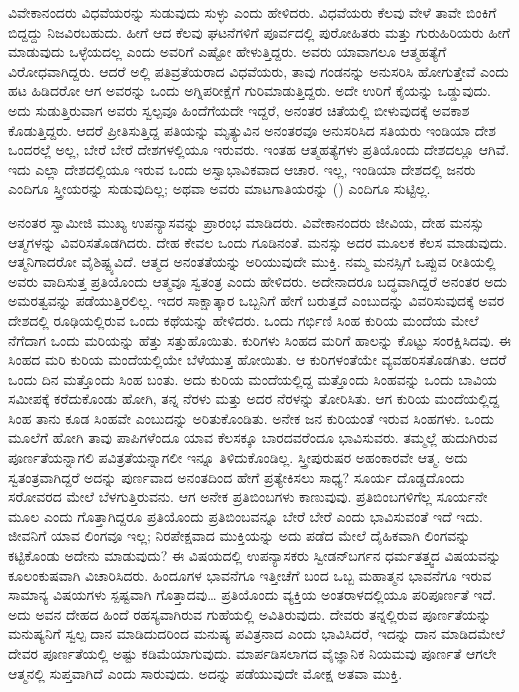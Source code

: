  ವಿವೇಕಾನಂದರು ವಿಧವೆಯರನ್ನು ಸುಡುವುದು ಸುಳ್ಳು ಎಂದು ಹೇಳಿದರು. ವಿಧವೆಯರು ಕೆಲವು ವೇಳೆ ತಾವೇ ಬಿಂಕಿಗೆ ಬಿದ್ದದ್ದು ನಿಜವಿರಬಹುದು. ಹೀಗೆ ಆದ ಕೆಲವು ಘಟನೆಗಳಿಗೆ ಪೂರ್ವದಲ್ಲಿ ಪುರೋಹಿತರು ಮತ್ತು ಗುರುಹಿರಿಯರು ಹೀಗೆ ಮಾಡುವುದು ಒಳ್ಳೆಯದಲ್ಲ ಎಂದು ಅವರಿಗೆ ಎಷ್ಟೋ ಹೇಳುತ್ತಿದ್ದರು. ಅವರು ಯಾವಾಗಲೂ ಆತ್ಮಹತ್ಯೆಗೆ ವಿರೋಧವಾಗಿದ್ದರು. ಆದರೆ ಅಲ್ಲಿ ಪತಿವ್ರತೆಯರಾದ ವಿಧವೆಯರು, ತಾವು ಗಂಡನನ್ನು ಅನುಸರಿಸಿ ಹೋಗುತ್ತೇವೆ ಎಂದು ಹಟ ಹಿಡಿದರೋ ಆಗ ಅವರನ್ನು ಒಂದು ಅಗ್ನಿಪರೀಕ್ಷೆಗೆ ಗುರಿಮಾಡುತ್ತಿದ್ದರು. ಅದೇ ಉರಿಗೆ ಕೈಯನ್ನು ಒಡ್ಡುವುದು. ಅದು ಸುಡುತ್ತಿರುವಾಗ ಅವರು ಸ್ವಲ್ಪವೂ ಹಿಂದೆಗೆಯದೇ ಇದ್ದರೆ, ಅನಂತರ ಚಿತೆಯಲ್ಲಿ ಬೀಳುವುದಕ್ಕೆ ಅವಕಾಶ ಕೊಡುತ್ತಿದ್ದರು. ಆದರೆ ಪ್ರೀತಿಸುತ್ತಿದ್ದ ಪತಿಯನ್ನು ಮೃತ್ಯುವಿನ ಅನಂತರವೂ ಅನುಸರಿಸಿದ ಸತಿಯರು ಇಂಡಿಯಾ ದೇಶ ಒಂದರಲ್ಲೆ ಅಲ್ಲ, ಬೇರೆ ಬೇರೆ ದೇಶಗಳಲ್ಲಿಯೂ ಇರುವರು. ಇಂತಹ ಆತ್ಮಹತ್ಯೆಗಳು ಪ್ರತಿಯೊಂದು ದೇಶದಲ್ಲೂ ಆಗಿವೆ. ಇದು ಎಲ್ಲಾ ದೇಶದಲ್ಲಿಯೂ ಇರುವ ಒಂದು ಅಸ್ವಾಭಾವಿಕವಾದ ಆಚಾರ. ಇಲ್ಲ, ಇಂಡಿಯಾ ದೇಶದಲ್ಲಿ ಜನರು ಎಂದಿಗೂ ಸ್ತ್ರೀಯರನ್ನು ಸುಡುವುದಿಲ್ಲ; ಅಥವಾ ಅವರು ಮಾಟಗಾತಿಯರನ್ನು () ಎಂದಿಗೂ ಸುಟ್ಟಿಲ್ಲ. 

 ಅನಂತರ ಸ್ವಾಮೀಜಿ ಮುಖ್ಯ ಉಪನ್ಯಾಸವನ್ನು ಪ್ರಾರಂಭ ಮಾಡಿದರು. ವಿವೇಕಾನಂದರು ಜೀವಿಯ, ದೇಹ ಮನಸ್ಸು ಆತ್ಮಗಳನ್ನು ವಿವರಿಸತೊಡಗಿದರು. ದೇಹ ಕೇವಲ ಒಂದು ಗೂಡಿನಂತೆ. ಮನಸ್ಸು ಅದರ ಮೂಲಕ ಕೆಲಸ ಮಾಡುವುದು. ಆತ್ಮನಿಗಾದರೋ ವೈಶಿಷ್ಟ್ಯವಿದೆ. ಆತ್ಮದ ಅನಂತತೆಯನ್ನು ಅರಿಯುವುದೇ ಮುಕ್ತಿ. ನಮ್ಮ ಮನಸ್ಸಿಗೆ ಒಪ್ಪುವ ರೀತಿಯಲ್ಲಿ ಅವರು ವಾದಿಸುತ್ತ ಪ್ರತಿಯೊಂದು ಆತ್ಮವೂ ಸ್ವತಂತ್ರ ಎಂದು ಹೇಳಿದರು. ಅದೇನಾದರೂ ಬದ್ಧವಾಗಿದ್ದರೆ ಅನಂತರ ಅದು ಅಮರತ್ವವನ್ನು ಪಡೆಯುತ್ತಿರಲಿಲ್ಲ. ಇದರ ಸಾಕ್ಷಾತ್ಕಾರ ಒಬ್ಬನಿಗೆ ಹೇಗೆ ಬರುತ್ತದೆ ಎಂಬುದನ್ನು ವಿವರಿಸುವುದಕ್ಕೆ ಅವರ ದೇಶದಲ್ಲಿ ರೂಢಿಯಲ್ಲಿರುವ ಒಂದು ಕಥೆಯನ್ನು ಹೇಳಿದರು. ಒಂದು ಗರ್ಭಿಣಿ ಸಿಂಹ ಕುರಿಯ ಮಂದೆಯ ಮೇಲೆ ನೆಗೆದಾಗ ಒಂದು ಮರಿಯನ್ನು ಹೆತ್ತು ಸತ್ತುಹೊಯಿತು. ಕುರಿಗಳು ಸಿಂಹದ ಮರಿಗೆ ಹಾಲನ್ನು ಕೊಟ್ಟು ಸಂರಕ್ಷಿಸಿದವು. ಈ ಸಿಂಹದ ಮರಿ ಕುರಿಯ ಮಂದೆಯಲ್ಲಿಯೇ ಬೆಳೆಯುತ್ತ ಹೋಯಿತು. ಆ ಕುರಿಗಳಂತೆಯೇ ವ್ಯವಹರಿಸತೊಡಗಿತು. ಆದರೆ ಒಂದು ದಿನ ಮತ್ತೊಂದು ಸಿಂಹ ಬಂತು. ಅದು ಕುರಿಯ ಮಂದೆಯಲ್ಲಿದ್ದ ಮತ್ತೊಂದು ಸಿಂಹವನ್ನು ಒಂದು ಬಾವಿಯ ಸಮೀಪಕ್ಕೆ ಕರೆದುಕೊಂಡು ಹೋಗಿ, ತನ್ನ ನೆರಳು ಮತ್ತು ಅದರ ನೆರಳನ್ನು ತೋರಿಸಿತು. ಆಗ ಕುರಿಯ ಮಂದೆಯಲ್ಲಿದ್ದ ಸಿಂಹ ತಾನು ಕೂಡ ಸಿಂಹವೇ ಎಂಬುದನ್ನು ಅರಿತುಕೊಂಡಿತು. ಅನೇಕ ಜನ ಕುರಿಯಂತೆ ಇರುವ ಸಿಂಹಗಳು. ಒಂದು ಮೂಲೆಗೆ ಹೋಗಿ ತಾವು ಪಾಪಿಗಳೆಂದೂ ಯಾವ ಕೆಲಸಕ್ಕೂ ಬಾರದವರೆಂದೂ ಭಾವಿಸುವರು. ತಮ್ಮಲ್ಲೆ ಹುದುಗಿರುವ ಪೂರ್ಣತೆಯನ್ನಾಗಲಿ ಪವಿತ್ರತೆಯನ್ನಾಗಲೀ ಇನ್ನೂ ತಿಳಿದುಕೊಂಡಿಲ್ಲ. ಸ್ತ್ರೀಪುರುಷರ ಅಹಂಕಾರವೇ ಆತ್ಮ. ಅದು ಸ್ವತಂತ್ರವಾಗಿದ್ದರೆ ಅದನ್ನು ಪುರ್ಣವಾದ ಅನಂತದಿಂದ ಹೇಗೆ ಪ್ರತ್ಯೇಕಿಸಲು ಸಾಧ್ಯ? ಸೂರ್ಯ ದೊಡ್ಡದೊಂದು ಸರೋವರದ ಮೇಲೆ ಬೆಳಗುತ್ತಿರುವನು. ಆಗ ಅನೇಕ ಪ್ರತಿಬಿಂಬಗಳು ಕಾಣುವುವು. ಪ್ರತಿಬಿಂಬಗಳಿಗೆಲ್ಲ ಸೂರ್ಯನೇ ಮೂಲ ಎಂದು ಗೊತ್ತಾಗಿದ್ದರೂ ಪ್ರತಿಯೊಂದು ಪ್ರತಿಬಿಂಬವನ್ನೂ ಬೇರೆ ಬೇರೆ ಎಂದು ಭಾವಿಸುವಂತೆ ಇದೆ ಇದು. ಜೀವನಿಗೆ ಯಾವ ಲಿಂಗವೂ ಇಲ್ಲ; ನಿರಪೇಕ್ಷವಾದ ಮುಕ್ತಿಯನ್ನು ಅದು ಪಡೆದ ಮೇಲೆ ದೈಹಿಕವಾಗಿ ಲಿಂಗವನ್ನು ಕಟ್ಟಿಕೊಂಡು ಅದೇನು ಮಾಡುವುದು? ಈ ವಿಷಯದಲ್ಲಿ ಉಪನ್ಯಾಸಕರು ಸ್ವೀಡನ್‍ಬರ್ಗನ ಧರ್ಮತತ್ತ್ವದ ವಿಷಯವನ್ನು ಕೂಲಂಕುಷವಾಗಿ ವಿಚಾರಿಸಿದರು. ಹಿಂದೂಗಳ ಭಾವನೆಗೂ ಇತ್ತೀಚೆಗೆ ಬಂದ ಒಬ್ಬ ಮಹಾತ್ಮನ ಭಾವನೆಗೂ ಇರುವ ಸಾಮಾನ್ಯ ವಿಷಯಗಳು ಸ್ಪಷ್ಟವಾಗಿ ಗೊತ್ತಾದವು… ಪ್ರತಿಯೊಂದು ವ್ಯಕ್ತಿಯ ಅಂತರಾಳದಲ್ಲಿಯೂ ಪರಿಪೂರ್ಣತೆ ಇದೆ. ಅದು ಅವನ ದೇಹದ ಹಿಂದೆ ರಹಸ್ಯವಾಗಿರುವ ಗುಹೆಯಲ್ಲಿ ಅವಿತಿರುವುದು. ದೇವರು ತನ್ನಲ್ಲಿರುವ ಪೂರ್ಣತೆಯನ್ನು ಮನುಷ್ಯನಿಗೆ ಸ್ವಲ್ಪ ದಾನ ಮಾಡಿದುದರಿಂದ ಮನುಷ್ಯ ಪವಿತ್ರನಾದ ಎಂದು ಭಾವಿಸಿದರೆ, ಇದನ್ನು ದಾನ ಮಾಡಿದಮೇಲೆ ದೇವರ ಪೂರ್ಣತೆಯಲ್ಲಿ ಅಷ್ಟು ಕಡಿಮೆಯಾಗುವುದು. ಮಾರ್ಪಡಿಸಲಾಗದ ವೈಜ್ಞಾನಿಕ ನಿಯಮವು ಪೂರ್ಣತೆ ಆಗಲೇ ಆತ್ಮನಲ್ಲಿ ಸುಪ್ತವಾಗಿದೆ ಎಂದು ಸಾರುವುದು. ಅದನ್ನು ಪಡೆಯುವುದೇ ಮೋಕ್ಷ ಅತವಾ ಮುಕ್ತಿ. 

